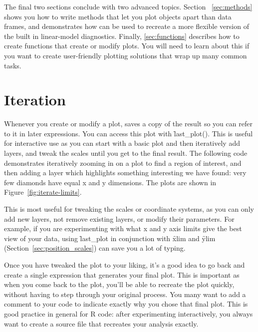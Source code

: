 The final two sections conclude with two advanced topics.  Section~ \ref{sec:methods} shows you how to write methods that let you plot objects apart than data frames, and demonstrates how \ggplot can be used to recreate a more flexible version of the built in linear-model diagnostics.  Finally, \ref{sec:functions} describes how to create functions that create or modify plots. You will need to learn about this if you want to create user-friendly plotting solutions that wrap up many common tasks.

\section{Iteration}
\label{sec:iteration}

Whenever you create or modify a plot, \ggplot saves a copy of the result so you can refer to it in later expressions.  You can access this plot with \f{last_plot()}.  This is useful for interactive use as you can start with a basic plot and then iteratively add layers, and tweak the scales until you get to the final result.  The following code demonstrates iteratively zooming in on a plot to find a region of interest, and then adding a layer which highlights something interesting we have found: very few diamonds have equal x and y dimensions.  The plots are shown in Figure~\ref{fig:iterate-limits}.

% 


This is most useful for tweaking the scales or coordinate systems, as you can only add new layers, not remove existing layers, or modify their parameters.  For example, if you are experimenting with what x and y axis limits give the best view of your data, using \f{last_plot} in conjunction with \f{xlim} and \f{ylim} (Section~\ref{sec:position_scales}) can save you a lot of typing.  

Once you have tweaked the plot to your liking, it's a good idea to go back and create a single expression that generates your final plot.  This is important as when you come back to the plot, you'll be able to recreate the plot quickly, without having to step through your original process.  You many want to add a comment to your code to indicate exactly why you chose that final plot.  This is good practice in general for R code: after experimenting interactively, you always want to create a source file that recreates your analysis exactly.

